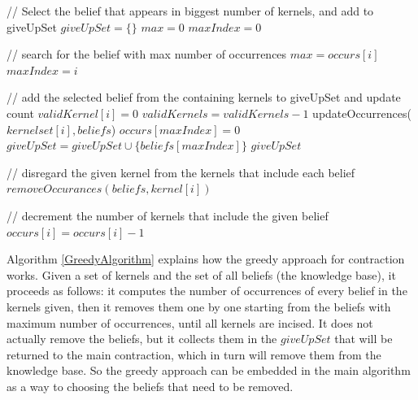 \begin{algorithm}
\begin{algorithmic}[1]
\State // Select the belief that appears in biggest number of kernels, and add to giveUpSet
\State $giveUpSet = \lbrace \rbrace$
\State $max = 0$
\State $maxIndex = 0$

\State // search for the belief with max number of occurrences
\State $max = occurs[i]$
\State $maxIndex = i$
\EndIf
\EndFor

\State // add the selected belief from the containing kernels to giveUpSet and update count
\State $validKernel[i] = 0$
\State $validKernels = validKernels - 1$
\State updateOccurrences($kernelset[i], beliefs$)
\EndIf
\EndFor
\State $occurs[maxIndex] = 0$
\State $giveUpSet = giveUpSet \cup \lbrace beliefs[maxIndex] \rbrace$
\EndWhile
\State \Return $giveUpSet$
\EndFunction
\end{algorithmic}
\end{algorithm}

\begin{algorithm}
\begin{algorithmic}[1]
\State // disregard the given kernel from the kernels that include each belief
\State $removeOccurances(beliefs, kernel[i])$
\EndFor
\EndFunction
\end{algorithmic}

\begin{algorithmic}[1]
\State // decrement the number of kernels that include the given belief
\State $occurs[i] = occurs[i] - 1$
\EndIf
\EndFor
\EndFunction
\end{algorithmic}
\end{algorithm}

Algorithm \ref{GreedyAlgorithm} explains how the greedy approach for contraction works. Given a set of kernels and the set of all beliefs (the knowledge base), it proceeds as follows: it computes the number of occurrences of every belief in the kernels given, then it removes them one by one starting from the beliefs with maximum number of occurrences, until all kernels are incised. It does not actually remove the beliefs, but it collects them in the $giveUpSet$ that will be returned to the main contraction, which in turn will remove them from the knowledge base. So the greedy approach can be embedded in the main algorithm as a way to choosing the beliefs that need to be removed. 
	
